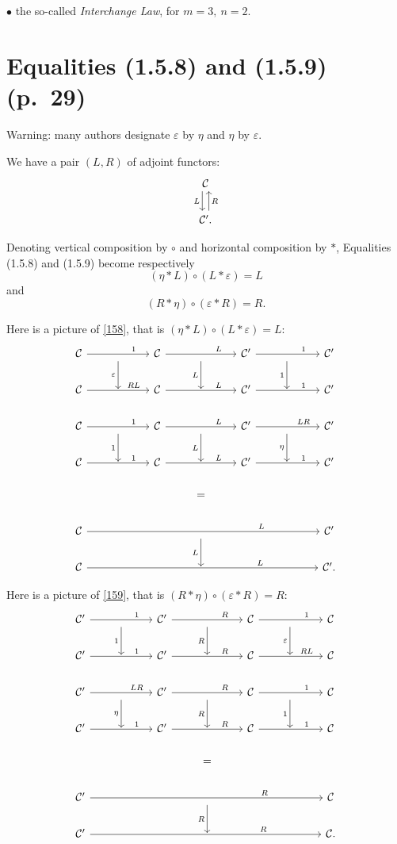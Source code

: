 \documentclass[12pt]{article}
\theoremstyle{remark}
\theoremstyle{definition}
\newcommand{\bu}{\bullet}
\newcommand{\C}{\mathcal C}
\begin{document}
\noindent$\bu$ the so-called \emph{Interchange Law}, for $m=3,\ n=2$.
%
\section{Equalities (1.5.8) and (1.5.9) (p.~29)} %
%
Warning: many authors designate $\varepsilon$ by $\eta$ and $\eta$ by $\varepsilon$. 

We have a pair $(L,R)$ of adjoint functors: 
$$
\begin{tikzcd}
\C\ar[xshift=-.7ex]{d}[swap]{L}\\ 
\C'.\ar[xshift=.7ex]{u}[swap]{R}
\end{tikzcd}
$$

Denoting vertical composition by $\circ$ and horizontal composition by $*$, Equalities (1.5.8) and (1.5.9) become respectively 
%
\begin{equation}\label{158} 
(\eta*L)\circ(L*\varepsilon)=L
\end{equation} 
%
and 
%
\begin{equation}\label{159} 
(R*\eta)\circ(\varepsilon*R)=R.
\end{equation} 
%

Here is a picture of \eqref{158}, that is $(\eta*L)\circ(L*\varepsilon)=L$: 
$$
\begin{tikzcd}
%
\C\ar{rr}{}[near end]{1}&\ar{d}[swap]{\varepsilon}&\C\ar{rr}{}[near end]{L}&\ar{d}[swap]{L}&\C'\ar{rr}{}[near end]{1}&\ar{d}[swap]{1}&\C'\\ 
%
\C\ar{rr}{}[near end]{RL}&{}&\C\ar{rr}{}[near end]{L}&{}&\C'\ar{rr}{}[near end]{1}&{}&\C'\\ 
%
\C\ar{rr}{}[near end]{1}&\ar{d}[swap]{1}&\C\ar{rr}{}[near end]{L}&\ar{d}[swap]{L}&\C'\ar{rr}{}[near end]{LR}&\ar{d}[swap]{\eta}&\C'\\ 
%
\C\ar{rr}{}[near end]{1}&{}&\C\ar{rr}{}[near end]{L}&{}&\C'\ar{rr}{}[near end]{1}&{}&\C'\\ 
%
&&&=\\ 
%
\C\ar{rrrrrr}[near end]{L}&&&{}\ar{d}[swap]{L}&&&\C'\\
%
\C\ar{rrrrrr}[near end]{L}&&&{}&&&\C'.
%
\end{tikzcd}
$$ 

Here is a picture of \eqref{159}, that is $(R*\eta)\circ(\varepsilon*R)=R$: 
$$
\begin{tikzcd}
%
\C'\ar{rr}{}[near end]{1}&\ar{d}[swap]{1}&\C'\ar{rr}{}[near end]{R}&\ar{d}[swap]{R}&\C\ar{rr}{}[near end]{1}&\ar{d}[swap]{\varepsilon}&\C\\ 
%
\C'\ar{rr}{}[near end]{1}&{}&\C'\ar{rr}{}[near end]{R}&{}&\C\ar{rr}{}[near end]{RL}&{}&\C\\ 
%
\C'\ar{rr}{}[near end]{LR}&\ar{d}[swap]{\eta}&\C'\ar{rr}{}[near end]{R}&\ar{d}[swap]{R}&\C\ar{rr}{}[near end]{1}&\ar{d}[swap]{1}&\C\\ 
%
\C'\ar{rr}{}[near end]{1}&{}&\C'\ar{rr}{}[near end]{R}&{}&\C\ar{rr}{}[near end]{1}&{}&\C\\ 
%
&&&=\\ 
%
\C'\ar{rrrrrr}[near end]{R}&&&{}\ar{d}[swap]{R}&&&\C\\
%
\C'\ar{rrrrrr}[near end]{R}&&&{}&&&\C.
%
\end{tikzcd}
$$ 
\end{document}
